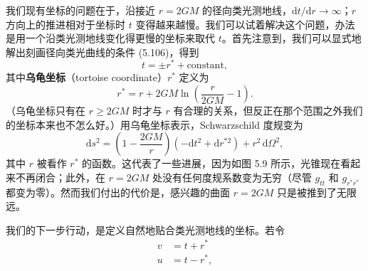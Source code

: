 
我们现有坐标的问题在于，沿接近 $r = 2GM$ 的径向类光测地线，$\mathrm{d}t/\mathrm{d}r \to \infty$；$r$ 方向上的推进相对于坐标时 $t$ 变得越来越慢。我们可以试着解决这个问题，办法是用一个沿类光测地线变化得更慢的坐标来取代 $t$。首先注意到，我们可以显式地解出刻画径向类光曲线的条件 (5.106)，得到
\begin{equation*}
t = \pm r^* + \text{constant},
\tag{5.107}
\end{equation*}
其中\textbf{乌龟坐标}（tortoise coordinate）$r^*$ 定义为
\begin{equation*}
r^* = r + 2GM\ln\left(\frac{r}{2GM} - 1\right).
\tag{5.108}
\end{equation*}
（乌龟坐标只有在 $r \geq 2GM$ 时才与 $r$ 有合理的关系，但反正在那个范围之外我们的坐标本来也不怎么好。）用乌龟坐标表示，Schwarzschild 度规变为
\begin{equation*}
\mathrm{d}s^2 = \left(1 - \frac{2GM}{r}\right)\left(-\mathrm{d}t^2 + \mathrm{d}r^{*2}\right) + r^2\,\mathrm{d}\Omega^2,
\tag{5.109}
\end{equation*}
其中 $r$ 被看作 $r^*$ 的函数。这代表了一些进展，因为如图 5.9 所示，光锥现在看起来不再闭合；此外，在 $r = 2GM$ 处没有任何度规系数变为无穷（尽管 $g_{tt}$ 和 $g_{r^* r^*}$ 都变为零）。然而我们付出的代价是，感兴趣的曲面 $r = 2GM$ 只是被推到了无限远。

我们的下一步行动，是定义自然地贴合类光测地线的坐标。若令
\begin{align*}
v &= t + r^*\\
u &= t - r^*,
\tag{5.110}
\end{align*}


